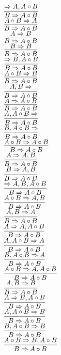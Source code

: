 \documentclass[11pt]{article}
\begin{document}
\begin{center}
\bigskip
\\$\infer{B\Rightarrow A\circ B}{\Rightarrow A, A\circ B}$
\bigskip
\\$\infer{B\Rightarrow A\circ B}{A\circ B\Rightarrow A}$
\bigskip
\\$\infer{B\Rightarrow A\circ B}{A\Rightarrow B}$
\bigskip
\\$\infer{B\Rightarrow A\circ B}{B\Rightarrow B}$
\bigskip
\\$\infer{B\Rightarrow A\circ B}{\Rightarrow B, A\circ B}$
\bigskip
\\$\infer{B\Rightarrow A\circ B}{A\circ B\Rightarrow B}$
\bigskip
\\$\infer{B\Rightarrow A\circ B}{A, B\Rightarrow }$
\bigskip
\\$\infer{B\Rightarrow A\circ B}{A\Rightarrow A\circ B}$
\bigskip
\\$\infer{B\Rightarrow A\circ B}{A, A\circ B\Rightarrow }$
\bigskip
\\$\infer{B\Rightarrow A\circ B}{B, A\circ B\Rightarrow }$
\bigskip
\\$\infer{B\Rightarrow A\circ B}{A\circ B\Rightarrow A\circ B}$
\bigskip
\\$\infer{B\Rightarrow A\circ B}{A\Rightarrow A, B}$
\bigskip
\\$\infer{B\Rightarrow A\circ B}{B\Rightarrow A, B}$
\bigskip
\\$\infer{B\Rightarrow A\circ B}{\Rightarrow A, B, A\circ B}$
\bigskip
\\$\infer{B\Rightarrow A\circ B}{A\circ B\Rightarrow A, B}$
\bigskip
\\$\infer{B\Rightarrow A\circ B}{A, B\Rightarrow A}$
\bigskip
\\$\infer{B\Rightarrow A\circ B}{A\Rightarrow A, A\circ B}$
\bigskip
\\$\infer{B\Rightarrow A\circ B}{A, A\circ B\Rightarrow A}$
\bigskip
\\$\infer{B\Rightarrow A\circ B}{B, A\circ B\Rightarrow A}$
\bigskip
\\$\infer{B\Rightarrow A\circ B}{A\circ B\Rightarrow A, A\circ B}$
\bigskip
\\$\infer{B\Rightarrow A\circ B}{A, B\Rightarrow B}$
\bigskip
\\$\infer{B\Rightarrow A\circ B}{A\Rightarrow B, A\circ B}$
\bigskip
\\$\infer{B\Rightarrow A\circ B}{A, A\circ B\Rightarrow B}$
\bigskip
\\$\infer{B\Rightarrow A\circ B}{B, A\circ B\Rightarrow B}$
\bigskip
\\$\infer{B\Rightarrow A\circ B}{A\circ B\Rightarrow B, A\circ B}$

\end{center}
\end{document}
